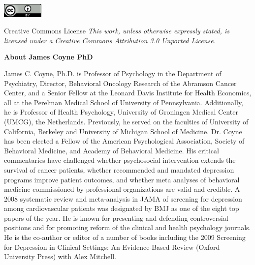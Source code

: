 \documentclass[11pt,twoside,a4paper]{article}
\begin{document}
\begin{center}
	\hfill \begin{minipage}[h]{2.25cm}
		\includegraphics[width=2.00cm]{img/88x31.png}
	\end{minipage} \hfill \begin{minipage}[h]{10.00cm}
		Creative Commons License	
		\emph{\small This work, unless otherwise expressly stated, is licensed under a Creative Commons Attribution 3.0 Unported License. }
	\end{minipage} \hfill 
\end{center}

{\small 
	\textbf{About James Coyne PhD} %

	James C. Coyne, Ph.D. is Professor of Psychology in the Department of Psychiatry, Director, Behavioral Oncology Research of the Abramson Cancer Center, and a Senior Fellow at the Leonard Davis Institute for Health Economics, all at the Perelman Medical School of University of Pennsylvania. Additionally, he is Professor of Health Psychology, University of Groningen Medical Center (UMCG), the Netherlands. Previously, he served on the faculties of University of California, Berkeley and University of Michigan School of Medicine. Dr. Coyne has been elected a Fellow of the American Psychological Association, Society of Behavioral Medicine, and Academy of Behavioral Medicine. His critical commentaries have challenged whether psychosocial intervention extends the survival of cancer patients, whether recommended and mandated depression programs improve patient outcomes, and whether meta analyses of behavioral medicine commissioned by professional organizations are valid and credible. A 2008 systematic review and meta-analysis in JAMA of screening for depression among cardiovascular patients was designated by BMJ as one of the eight top papers of the year. He is known for presenting and defending controversial positions and for promoting reform of the clinical and health psychology journals. He is the co-author or editor of a number of books including the 2009 Screening for Depression in Clinical Settings: An Evidence-Based Review (Oxford University Press) with Alex Mitchell. ~\\
} %
\end{document}
